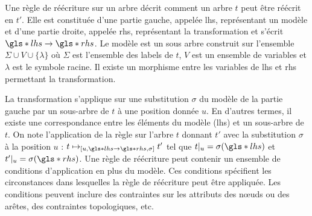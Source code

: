\begin{definition}
    Une règle de réécriture sur un arbre décrit comment un arbre $t$ peut être réécrit en $t'$.
    Elle est constituée d'une partie gauche, appelée \gls{lhs}, représentant un modèle et d'une partie droite, appelée \gls{rhs}, représentant la transformation et s'écrit $\gls*{lhs} \to \gls*{rhs}$.
    Le modèle est un sous arbre construit sur l'ensemble $\Sigma \cup V \cup \{\lambda\}$ où $\Sigma$ est l'ensemble des labels de $t$, $V$ est un ensemble de variables et $\lambda$ est le symbole racine.
    Il existe un morphisme entre les variables de \gls{lhs} et \gls{rhs} permettant la transformation.

    La transformation s'applique sur une substitution $\sigma$ du modèle de la partie gauche par un sous-arbre de $t$ à une position donnée $u$.
    En d'autres termes, il existe une correspondance entre les éléments du modèle (\gls{lhs}) et un sous-arbre de $t$.
    On note l'application de la règle sur l'arbre $t$ donnant $t'$ avec la substitution $\sigma$ à la position $u$ : $t \mapsto_{[u, \gls*{lhs} \to \gls*{rhs}, \sigma]} t'$ tel que $t|_u = \sigma(\gls*{lhs})$ et $t'|_u = \sigma(\gls*{rhs})$.
    Une règle de réécriture peut contenir un ensemble de conditions d'application en plus du modèle.
    Ces conditions spécifient les circonstances dans lesquelles la règle de réécriture peut être appliquée.
    Les conditions peuvent inclure des contraintes sur les attributs des nœuds ou des arêtes, des contraintes topologiques, etc.
\end{definition}


